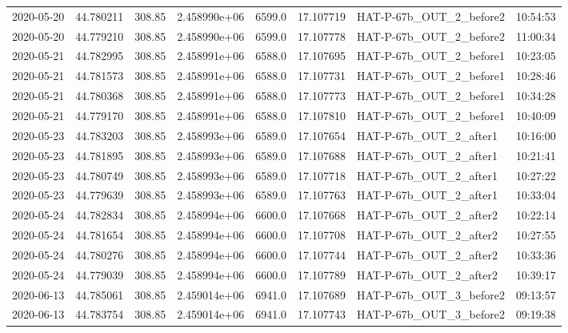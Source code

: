 \documentclass{aastex631}
\begin{document}
\begin{tabular}{lrrrlrll}
    2020-05-20 & 44.780211   & 308.85        & 2.458990e+06 & 6599.0 & 17.107719 & HAT-P-67b\_OUT\_2\_before2 & 10:54:53 \\
    2020-05-20 & 44.779210   & 308.85        & 2.458990e+06 & 6599.0 & 17.107778 & HAT-P-67b\_OUT\_2\_before2 & 11:00:34 \\
    2020-05-21 & 44.782995   & 308.85        & 2.458991e+06 & 6588.0 & 17.107695 & HAT-P-67b\_OUT\_2\_before1 & 10:23:05 \\
    2020-05-21 & 44.781573   & 308.85        & 2.458991e+06 & 6588.0 & 17.107731 & HAT-P-67b\_OUT\_2\_before1 & 10:28:46 \\
    2020-05-21 & 44.780368   & 308.85        & 2.458991e+06 & 6588.0 & 17.107773 & HAT-P-67b\_OUT\_2\_before1 & 10:34:28 \\
    2020-05-21 & 44.779170   & 308.85        & 2.458991e+06 & 6588.0 & 17.107810 & HAT-P-67b\_OUT\_2\_before1 & 10:40:09 \\
    2020-05-23 & 44.783203   & 308.85        & 2.458993e+06 & 6589.0 & 17.107654 & HAT-P-67b\_OUT\_2\_after1  & 10:16:00 \\
    2020-05-23 & 44.781895   & 308.85        & 2.458993e+06 & 6589.0 & 17.107688 & HAT-P-67b\_OUT\_2\_after1  & 10:21:41 \\
    2020-05-23 & 44.780749   & 308.85        & 2.458993e+06 & 6589.0 & 17.107718 & HAT-P-67b\_OUT\_2\_after1  & 10:27:22 \\
    2020-05-23 & 44.779639   & 308.85        & 2.458993e+06 & 6589.0 & 17.107763 & HAT-P-67b\_OUT\_2\_after1  & 10:33:04 \\
    2020-05-24 & 44.782834   & 308.85        & 2.458994e+06 & 6600.0 & 17.107668 & HAT-P-67b\_OUT\_2\_after2  & 10:22:14 \\
    2020-05-24 & 44.781654   & 308.85        & 2.458994e+06 & 6600.0 & 17.107708 & HAT-P-67b\_OUT\_2\_after2  & 10:27:55 \\
    2020-05-24 & 44.780276   & 308.85        & 2.458994e+06 & 6600.0 & 17.107744 & HAT-P-67b\_OUT\_2\_after2  & 10:33:36 \\
    2020-05-24 & 44.779039   & 308.85        & 2.458994e+06 & 6600.0 & 17.107789 & HAT-P-67b\_OUT\_2\_after2  & 10:39:17 \\
    2020-06-13 & 44.785061   & 308.85        & 2.459014e+06 & 6941.0 & 17.107689 & HAT-P-67b\_OUT\_3\_before2 & 09:13:57 \\
    2020-06-13 & 44.783754   & 308.85        & 2.459014e+06 & 6941.0 & 17.107743 & HAT-P-67b\_OUT\_3\_before2 & 09:19:38 \\

\end{tabular}
\end{document}
